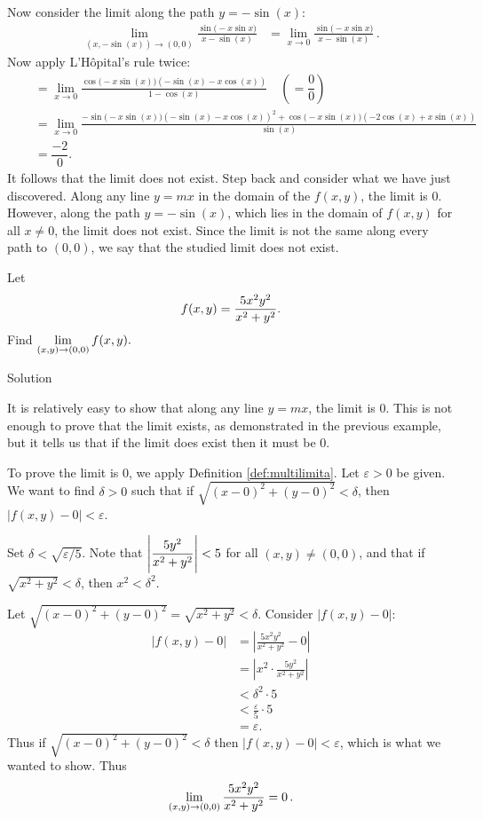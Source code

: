 \begin{example}
\begin{enumerate}
	Now consider the limit along the path $y=-\sin (x)$:
	\begin{align*}
	\lim_{(x,-\sin (x))\to (0,0)} \frac{\sin\big(-x\sin x\big)}{x-\sin (x)} &= \lim_{x\to0} \frac{\sin\big(-x\sin x\big)}{x-\sin (x)}\,.
	\end{align*}
	Now apply L'H\^opital's rule twice:
	\begin{align*}
	 \quad &= \lim_{x\to 0}\frac{\cos\big(-x\sin (x)\big)(-\sin (x)-x\cos (x))}{1-\cos (x)} \quad \left(= \dfrac{0}{0}\right)\\[0.2cm]
	&= \lim_{x\to 0}\frac{-\sin\big(-x\sin (x)\big)(-\sin (x)-x\cos (x))^2+\cos\big(-x\sin (x)\big)(-2\cos (x)+x\sin (x))}{\sin (x)}\\[0.2cm]
	&= \text{$\dfrac{-2}{0}$}.  
	\end{align*}
	It follows that the limit does not exist.
Step back and consider what we have just discovered. Along any line $y=mx$ in the domain of the $f(x,y)$, the limit is 0. However, along the path $y=-\sin (x)$, which lies in the domain of  $f(x,y)$ for all $x\neq 0$, the limit does not exist. Since the limit is not the same along every path to $(0,0)$, we say that the studied limit does not exist.
\end{enumerate}
\end{example}

\ifanalysis
\begin{example}\label{ex_multilimit5}

Let 
$$\displaystyle f(x,y) = \frac{5x^2y^2}{x^2+y^2}.$$
Find $\displaystyle\lim_{(x,y)\to (0,0)}  f(x,y) .$

Solution 

It is relatively easy to show that along any line $y=mx$, the limit is 0. This is not enough to prove that the limit exists, as demonstrated in the previous example, but it tells us that if the limit does exist then it must be 0.

To prove the limit is 0, we apply Definition \ref{def:multilimita}. Let $\varepsilon >0$ be given. We want to find $\delta >0$ such that if $\sqrt{(x-0)^2+(y-0)^2} <\delta$, then $|f(x,y)-0| <\varepsilon$.

Set $\delta < \sqrt{\varepsilon/5}$. Note that $\displaystyle \left|\frac{5y^2}{x^2+y^2}\right| <5$ for all $(x,y)\neq (0,0)$, and that if $\sqrt{x^2+y^2} <\delta$, then $x^2<\delta^2$.

Let $\sqrt{(x-0)^2+(y-0)^2} = \sqrt{x^2+y^2}<\delta$. Consider $|f(x,y)-0|$:
\begin{align*}
|f(x,y)-0| &= \left|\frac{5x^2y^2}{x^2+y^2}-0\right| \\
				&= \left|x^2\cdot\frac{5y^2}{x^2+y^2}\right|\\
				&< \delta^2\cdot 5 \\
				&< \frac{\varepsilon}{5}\cdot 5 \\
				&= \varepsilon.
\end{align*}
Thus if $\sqrt{(x-0)^2+(y-0)^2}<\delta$ then $|f(x,y)-0|<\varepsilon$, which is what we wanted to show. Thus $$\displaystyle \lim_{(x,y)\to(0,0)} \frac{5x^2y^2}{x^2+y^2} = 0\,.$$

\end{example}
\fi

